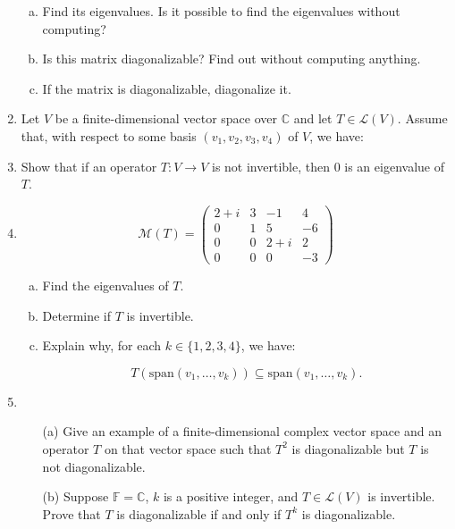 \documentclass[a4paper,11pt]{article}
\theoremstyle{definition}
\begin{document}
\begin{enumerate}[(1)]
\begin{enumerate}[(a)]
\item Find its eigenvalues. Is it possible to find the eigenvalues without computing?

\item Is this matrix diagonalizable? Find out without computing anything.

\item If the matrix is diagonalizable, diagonalize it.
\end{enumerate}

\item 
Let \( V \) be a finite-dimensional vector space over \( \mathbb{C} \) and let \( T \in \mathcal{L}(V) \). Assume that, with respect to some basis \( (v_1, v_2, v_3, v_4) \) of \( V \), we have:


\item 
Show that if an operator $T:V\to V$ is not invertible, then $0$ is an eigenvalue of $T$.

\item
\[
\mathcal{M}(T) = 
\begin{pmatrix}
2+i & 3 & -1 & 4 \\
0 & 1 & 5 & -6 \\
0 & 0 & 2+i & 2 \\
0 & 0 & 0 & -3
\end{pmatrix}
\]


\begin{enumerate}[(a)]
\item Find the eigenvalues of \( T \).
\item Determine if \( T \) is invertible.
\item Explain why, for each \( k \in \{1, 2, 3, 4\} \), we have:


\[
T(\text{span}(v_1, \ldots, v_k)) \subseteq \text{span}(v_1, \ldots, v_k).
\]

\end{enumerate}

\item
\begin{itemize}
    \item[(a)] Give an example of a finite-dimensional complex vector space and an operator \( T \) on that vector space such that \( T^2 \) is diagonalizable but \( T \) is not diagonalizable.
    \item[(b)] Suppose \( \mathbb{F} = \mathbb{C} \), \( k \) is a positive integer, and \( T \in \mathcal{L}(V) \) is invertible. Prove that \( T \) is diagonalizable if and only if \( T^k \) is diagonalizable.
\end{itemize}


\end{enumerate}
\end{document}
